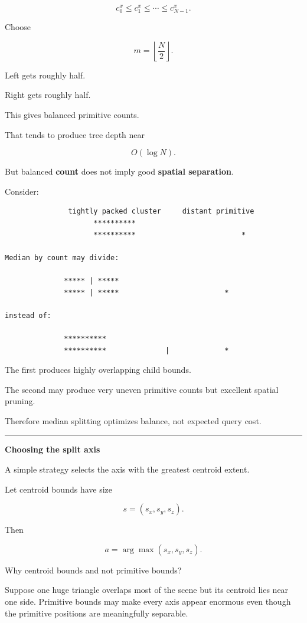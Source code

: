 \[
c_0^x\le c_1^x\le\cdots\le c_{N-1}^x.
\]

Choose

\[
m=\left\lfloor\frac N2\right\rfloor.
\]

Left gets roughly half.

Right gets roughly half.

This gives balanced primitive counts.

That tends to produce tree depth near

\[
O(\log N).
\]

But balanced \textbf{count} does not imply good \textbf{spatial separation}.

Consider:

\begin{verbatim}
               tightly packed cluster     distant primitive
                     **********
                     **********                         *

Median by count may divide:

              ***** | *****
              ***** | *****                         *

instead of:

              **********
              **********              |             *
\end{verbatim}

The first produces highly overlapping child bounds.

The second may produce very uneven primitive counts but excellent spatial pruning.

Therefore median splitting optimizes balance, not expected query cost.

\begin{center}\rule{0.5\linewidth}{0.5pt}\end{center}

\textbf{Choosing the split axis}

A simple strategy selects the axis with the greatest centroid extent.

Let centroid bounds have size

\[
s=(s_x,s_y,s_z).
\]

Then

\[
a=\arg\max(s_x,s_y,s_z).
\]

Why centroid bounds and not primitive bounds?

Suppose one huge triangle overlaps most of the scene but its centroid lies near one side. Primitive bounds may make every axis appear enormous even though the primitive positions are meaningfully separable.

